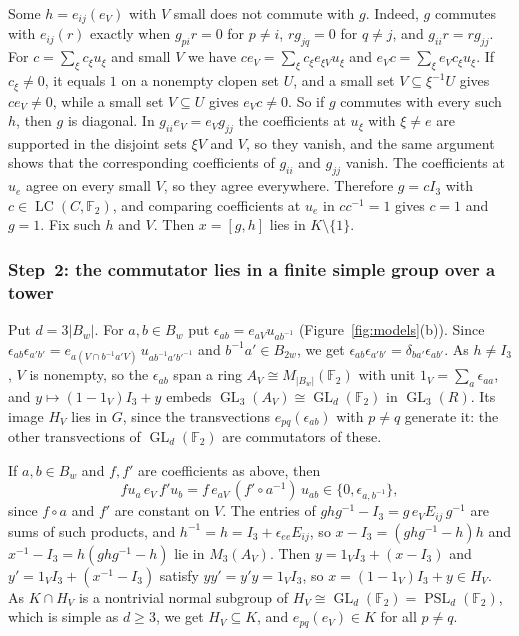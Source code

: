 \documentclass[11pt]{amsart}
\newcommand{\F}{\mathbb F}
\newcommand{\LC}{\operatorname{LC}}
\newcommand{\GL}{\operatorname{GL}}
\newcommand{\PSL}{\operatorname{PSL}}
\begin{document}
Some $h=e_{ij}(e_V)$ with $V$ small does not commute with $g$. Indeed, $g$
commutes with $e_{ij}(r)$ exactly when $g_{pi}r=0$ for $p\ne i$,
$rg_{jq}=0$ for $q\ne j$, and $g_{ii}r=rg_{jj}$. For $c=\sum_\xi c_\xi u_\xi$
and small $V$ we have $ce_V=\sum_\xi c_\xi e_{\xi V}u_\xi$ and
$e_Vc=\sum_\xi e_Vc_\xi u_\xi$. If $c_\xi\ne0$, it equals $1$ on a nonempty
clopen set $U$, and a small set $V\subseteq\xi^{-1}U$ gives $ce_V\ne0$,
while a small set $V\subseteq U$ gives $e_Vc\ne0$. So if $g$ commutes with
every such $h$, then $g$ is diagonal. In $g_{ii}e_V=e_Vg_{jj}$ the
coefficients at $u_\xi$ with $\xi\ne e$ are supported in the disjoint sets
$\xi V$ and $V$, so they vanish, and the same argument shows that the
corresponding coefficients of $g_{ii}$ and $g_{jj}$ vanish. The
coefficients at $u_e$ agree on every small $V$, so they agree everywhere.
Therefore $g=cI_3$ with $c\in\LC(C,\F_2)$, and comparing coefficients at
$u_e$ in $cc^{-1}=1$ gives $c=1$ and $g=1$. Fix such $h$ and $V$. Then
$x=[g,h]$ lies in $K\setminus\{1\}$.

\subsubsection*{Step~2: the commutator lies in a finite simple group over a tower}
Put $d=3|B_w|$. For $a,b\in B_w$ put $\epsilon_{ab}=e_{aV}u_{ab^{-1}}$
(Figure~\ref{fig:models}(b)). Since
$\epsilon_{ab}\epsilon_{a'b'}=e_{a(V\cap b^{-1}a'V)}\,u_{ab^{-1}a'b'^{-1}}$
and $b^{-1}a'\in B_{2w}$, we get
$\epsilon_{ab}\epsilon_{a'b'}=\delta_{ba'}\epsilon_{ab'}$. As $h\ne I_3$,
$V$ is nonempty, so the $\epsilon_{ab}$ span a ring
$A_V\cong M_{|B_w|}(\F_2)$ with unit $1_V=\sum_a\epsilon_{aa}$, and
$y\mapsto(1-1_V)I_3+y$ embeds $\GL_3(A_V)\cong\GL_d(\F_2)$ in $\GL_3(R)$. Its
image $H_V$ lies in $G$, since the transvections $e_{pq}(\epsilon_{ab})$
with $p\ne q$ generate it: the other transvections of $\GL_d(\F_2)$ are
commutators of these.

If $a,b\in B_w$ and $f,f'$ are coefficients as above, then
\[
  fu_a\,e_V\,f'u_b=f\,e_{aV}\,(f'\circ a^{-1})\,u_{ab}
  \in\{0,\epsilon_{a,b^{-1}}\},
\]
since $f\circ a$ and $f'$ are constant on $V$. The entries of
$ghg^{-1}-I_3=g\,e_VE_{ij}\,g^{-1}$ are sums of such products, and
$h^{-1}=h=I_3+\epsilon_{ee}E_{ij}$, so $x-I_3=(ghg^{-1}-h)h$ and
$x^{-1}-I_3=h(ghg^{-1}-h)$ lie in $M_3(A_V)$. Then $y=1_VI_3+(x-I_3)$ and
$y'=1_VI_3+(x^{-1}-I_3)$ satisfy $yy'=y'y=1_VI_3$, so
$x=(1-1_V)I_3+y\in H_V$. As $K\cap H_V$ is a nontrivial normal subgroup of
$H_V\cong\GL_d(\F_2)=\PSL_d(\F_2)$, which is simple as $d\ge3$, we get
$H_V\subseteq K$, and $e_{pq}(e_V)\in K$ for all $p\ne q$.
\end{document}
